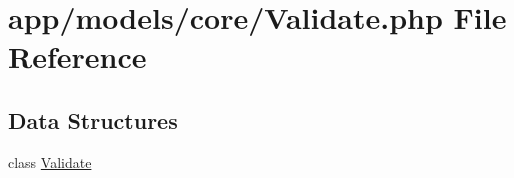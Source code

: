 \hypertarget{_validate_8php}{\section{app/models/core/\-Validate.php File Reference}
\label{_validate_8php}
}
\subsection*{Data Structures}
\begin{DoxyCompactItemize}
\item 
class \hyperlink{class_validate}{Validate}
\end{DoxyCompactItemize}
